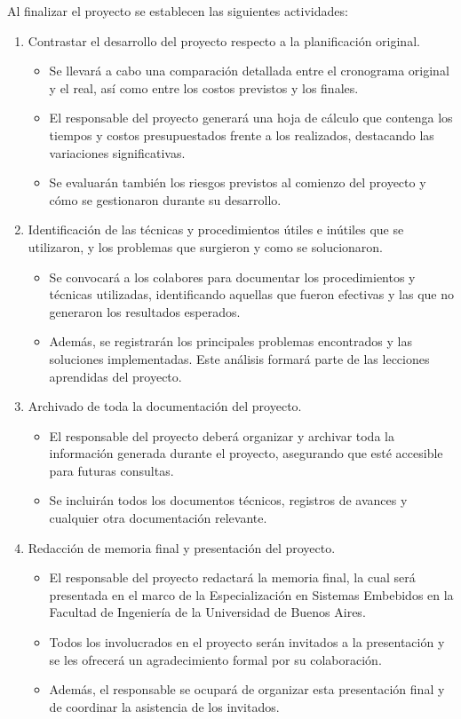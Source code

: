 \documentclass[
11pt, %
codirector, %
]{charter}
\begin{document}
Al finalizar el proyecto se establecen las siguientes actividades:

\begin{enumerate}
	\item Contrastar el desarrollo del proyecto respecto a la planificación original.
		\begin{itemize}
			\item Se llevará a cabo una comparación detallada entre el cronograma original y el real, así como entre los costos previstos y los finales.
			\item El responsable del proyecto generará una hoja de cálculo que contenga los tiempos y costos presupuestados frente a los realizados, destacando las variaciones significativas.
			\item Se evaluarán también los riesgos previstos al comienzo del proyecto y cómo se gestionaron durante su desarrollo.
		\end{itemize}

	\item Identificación de las técnicas y procedimientos útiles e inútiles que se utilizaron, y los
problemas que surgieron y como se solucionaron.
		\begin{itemize}
			\item Se convocará a los colabores para documentar los procedimientos y técnicas utilizadas, identificando aquellas que fueron efectivas y las que no generaron los resultados esperados.
			\item Además, se registrarán los principales problemas encontrados y las soluciones implementadas. Este análisis formará parte de las lecciones aprendidas del proyecto.
		\end{itemize}
		
	\item Archivado de toda la documentación del proyecto.
		\begin{itemize}
			\item El responsable del proyecto deberá organizar y archivar toda la información generada durante el proyecto, asegurando que esté accesible para futuras consultas.
			\item Se incluirán todos los documentos técnicos, registros de avances y cualquier otra documentación relevante.
		\end{itemize}
		
	\item Redacción de memoria final y presentación del proyecto.
		\begin{itemize}
			\item El responsable del proyecto redactará la memoria final, la cual será presentada en el marco de la Especialización en Sistemas Embebidos en la Facultad de Ingeniería de la Universidad de Buenos Aires.
			\item Todos los involucrados en el proyecto serán invitados a la presentación y se les ofrecerá un agradecimiento formal por su colaboración.
			\item Además, el responsable se ocupará de organizar esta presentación final y de coordinar la asistencia de los invitados.
		\end{itemize}

\end{enumerate}
\end{document}
